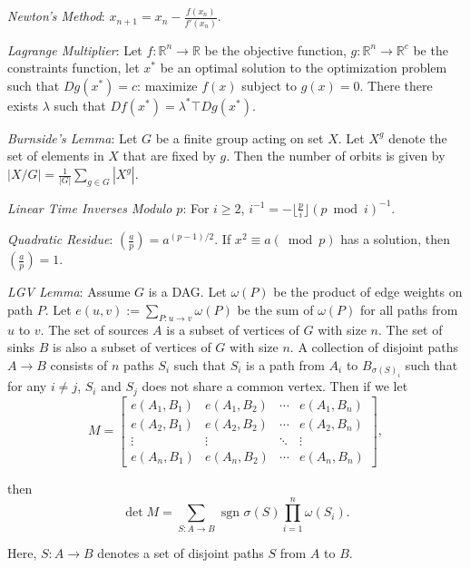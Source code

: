 \emph{Newton's Method}: $x_{n+1} = x_n - \frac{f(x_n)}{f'(x_n)}$.

\emph{Lagrange Multiplier}: Let $f: \mathbb{R}^n \rightarrow \mathbb{R}$ be the objective function, $g: \mathbb{R}^n \rightarrow \mathbb{R}^c$ be the constraints function, let $x^*$ be an optimal solution to the optimization problem such that $Dg(x^*) = c$: maximize $f(x)$ subject to $g(x) = 0$. There there exists $\lambda$ such that $Df(x^*) = \lambda^*\top Dg(x^*)$.

\emph{Burnside's Lemma}: Let $G$ be a finite group acting on set $X$. Let $X^g$ denote the set of elements in $X$ that are fixed by $g$. Then the number of orbits is given by $|X/G| = \frac{1}{|G|}\sum_{g \in G}|X^g|$.

\emph{Linear Time Inverses Modulo $p$}: For $i \geq 2$, $i^{-1} = -\lfloor \frac{p}{i} \rfloor (p \bmod i)^{-1}$.

\emph{Quadratic Residue}: $\left(\frac{a}{p} \right) = a^{(p-1)/2}$. If $x^2 \equiv a (\bmod p)$ has a solution, then $\left(\frac{a}{p} \right) = 1$.

\emph{LGV Lemma}: Assume $G$ is a DAG. Let $\omega(P)$ be the product of edge weights on path $P$. Let $e(u,v) := \sum_{P: u \rightarrow v} \omega(P)$ be the sum of $\omega(P)$ for all paths from $u$ to $v$. The set of sources $A$ is a subset of vertices of $G$ with size $n$. The set of sinks $B$ is also a subset of vertices of $G$ with size $n$. A collection of disjoint paths $A \rightarrow B$ consists of $n$ paths $S_i$ such that $S_i$ is a path from $A_i$ to $B_{\sigma(S)_i}$ such that for any $i \neq j$, $S_i$ and $S_j$ does not share a common vertex. Then if we let
\begin{equation*}
  M = \begin{bmatrix} e(A_1,B_1) & e(A_1,B_2) & \cdots & e(A_1,B_n) \\ e(A_2,B_1) & e(A_2,B_2) & \cdots & e(A_2,B_n) \\ \vdots & \vdots & \ddots & \vdots \\ e(A_n,B_1) & e(A_n,B_2) & \cdots & e(A_n,B_n) \end{bmatrix},
\end{equation*}

then
\begin{equation*}
  \det M = \sum_{S: A \rightarrow B}\text{ sgn } \sigma(S) \prod_{i=1}^n \omega(S_i).
\end{equation*}

Here, $S: A \rightarrow B$ denotes a set of disjoint paths $S$ from $A$ to $B$.

